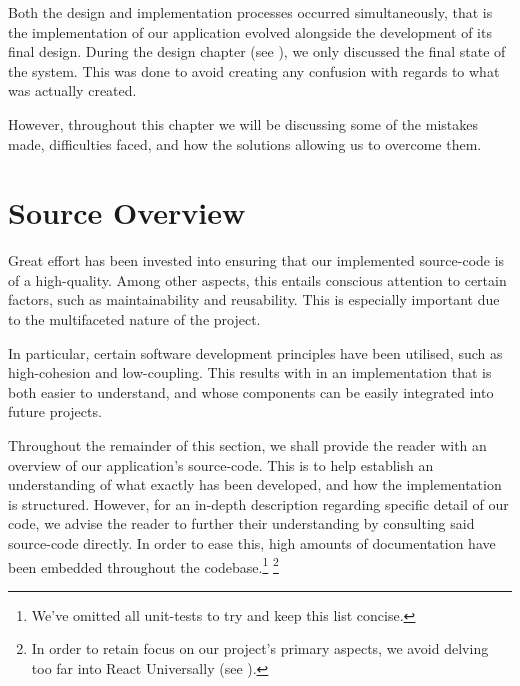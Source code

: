 \documentclass{standalone}
\begin{document}
	Both the design and implementation processes occurred simultaneously, that is the implementation of our application evolved alongside the development of its final design. During the design chapter (see ), we only discussed the final state of the system. This was done to avoid creating any confusion with regards to what was actually created.

	However, throughout this chapter we will be discussing some of the mistakes made, difficulties faced, and how the solutions allowing us to overcome them.

	\section{Source Overview}
		Great effort has been invested into ensuring that our implemented source-code is of a high-quality. Among other aspects, this entails conscious attention to certain factors, such as maintainability and reusability. This is especially important due to the multifaceted nature of the project.

		In particular, certain software development principles have been utilised, such as high-cohesion and low-coupling. This results with in an implementation that is both easier to understand, and whose components can be easily integrated into future projects.

		Throughout the remainder of this section, we shall provide the reader with an overview of our application's source-code. This is to help establish an understanding of what exactly has been developed, and how the implementation is structured. However, for an in-depth description regarding specific detail of our code, we advise the reader to further their understanding by consulting said source-code directly. In order to ease this, high amounts of documentation have been embedded throughout the codebase.\footnote{We've omitted all unit-tests to try and keep this list concise.} \footnote{In order to retain focus on our project's primary aspects, we avoid delving too far into React Universally (see ).}
\end{document}
